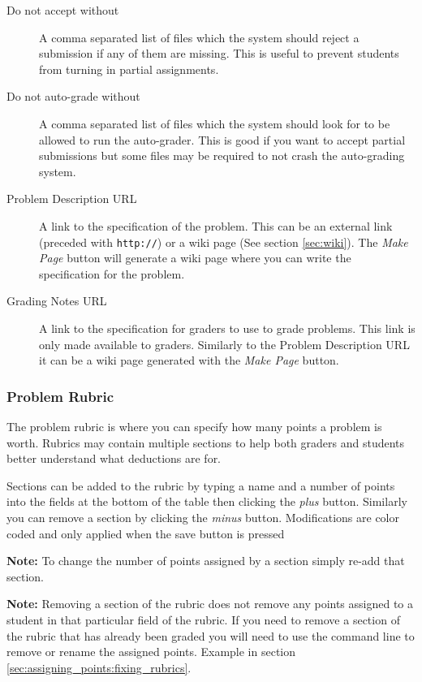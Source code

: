 \documentclass[11pt]{report}
\begin{document}
\begin{description}
\item[Do not accept without] A comma separated list of files which the system should reject a submission
if any of them are missing. This is useful to prevent students from turning in partial assignments.
\item[Do not auto-grade without] A comma separated list of files which the system should look for to
be allowed to run the auto-grader. This is good if you want to accept partial submissions but some files
may be required to not crash the auto-grading system.
\item[Problem Description URL] A link to the specification of the problem. This can be an external link
(preceded with \texttt{http://}) or a wiki page (See section \ref{sec:wiki}). The \emph{Make Page} button
will generate a wiki page where you can write the specification for the problem.
\item[Grading Notes URL] A link to the specification for graders to use to grade problems. This link is only
made available to graders. Similarly to the Problem Description URL it can be a wiki page generated with the
\emph{Make Page} button.
\end{description}

\subsubsection{Problem Rubric}
The problem rubric is where you can specify how many points a problem is worth. Rubrics may contain
multiple sections to help both graders and students better understand what deductions are for. 

Sections can be added to the rubric by typing a name and a number of points into the fields at the bottom
of the table then clicking the \emph{plus} button. Similarly you can remove a section by clicking the 
\emph{minus} button. Modifications are color coded and only applied when the save button is pressed

\noindent\textbf{Note:} To change the number of points assigned by a section simply re-add that section.

\noindent\textbf{Note:} Removing a section of the rubric does not remove any points assigned to a student 
in that particular field of the rubric. If you need to remove a section of the rubric that has already been
graded you will need to use the command line to remove or rename the assigned points. Example in section
\ref{sec:assigning_points:fixing_rubrics}.
\end{document}
